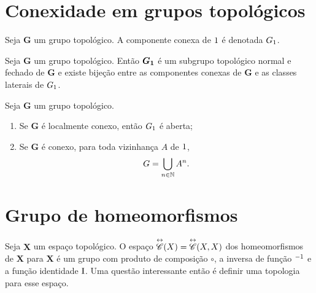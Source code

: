 \section{Conexidade em grupos topológicos}

\begin{definition}
Seja $\bm G$ um grupo topológico. A componente conexa de $1$ é denotada $G_1$.
\end{definition}

\begin{proposition}
Seja $\bm G$ um grupo topológico. Então $\bm{G_1}$ é um subgrupo topológico normal e fechado de $\bm G$ e existe bijeção entre as componentes conexas de $\bm G$ e as classes laterais de $G_1$.
\end{proposition}

\begin{proposition}
Seja $\bm G$ um grupo topológico.
	\begin{enumerate}
	\item Se $\bm G$ é localmente conexo, então $G_1$ é aberta;
	\item Se $\bm G$ é conexo, para toda vizinhança $A$ de $1$,
		\begin{equation*}
		G = \bigcup_{n \in \mathbb{N}} A^n.
		\end{equation*}
	\end{enumerate} 
\end{proposition}

\section{Grupo de homeomorfismos}

Seja $\bm X$ um espaço topológico. O espaço $\overset{\leftrightarrow}{\mathscr{C}}(X) = \overset{\leftrightarrow}{\mathscr{C}}(X,X)$ dos homeomorfismos de $\bm X$ para $\bm X$ é um grupo com produto de composição $\circ$, a inversa de função $^{-1}$ e a função identidade $\mathrm{I}$. Uma questão interessante então é definir uma topologia para esse espaço.

